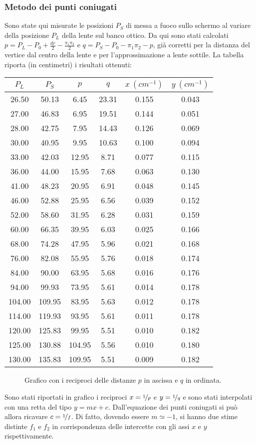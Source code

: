 \documentclass[italian,a4paper]{article}
\begin{document}
\subsubsection*{Metodo dei punti coniugati}
Sono state qui misurate le posizioni $P_S$ di messa a fuoco sullo schermo al variare della posizione $P_L$ della lente sul banco ottico. Da qui sono stati calcolati $p=P_L-P_0+\frac{dr}{2}-\frac{\pi_1\pi_2}{2}$ e $q=P_S-P_0-\pi_1\pi_2-p$, già corretti per la distanza del vertice dal centro della lente e per l'approssimazione a lente sottile. La tabella riporta (in centimetri) i risultati ottenuti:
\begin{table}[tp]
\centering
\begin{tabular}{*6c}
$P_L$& $P_S$& $p$& $q$& $x\:(\unit{cm^{-1}})$& $y\:(\unit{cm^{-1}})$\\\hline
26.50 &50.13 &6.45 &23.31 &0.155 &0.043\\
27.00 &46.83 &6.95 &19.51 &0.144 &0.051\\
28.00 &42.75 &7.95 &14.43 &0.126 &0.069\\
30.00 &40.95 &9.95 &10.63 &0.100 &0.094\\
33.00 &42.03 &12.95 &8.71 &0.077 &0.115\\
36.00 &44.00 &15.95 &7.68 &0.063 &0.130\\
41.00 &48.23 &20.95 &6.91 &0.048 &0.145\\
46.00 &52.88 &25.95 &6.56 &0.039 &0.152\\
52.00 &58.60 &31.95 &6.28 &0.031 &0.159\\
60.00 &66.35 &39.95 &6.03 &0.025 &0.166\\
68.00 &74.28 &47.95 &5.96 &0.021 &0.168\\
76.00 &82.08 &55.95 &5.76 &0.018 &0.174\\
84.00 &90.00 &63.95 &5.68 &0.016 &0.176\\
94.00 &99.93 &73.95 &5.61 &0.014 &0.178\\
104.00 &109.95 &83.95 &5.63 &0.012 &0.178\\
114.00 &119.93 &93.95 &5.61 &0.011 &0.178\\
120.00 &125.83 &99.95 &5.51 &0.010 &0.182\\
125.00 &130.88 &104.95 &5.56 &0.010 &0.180\\
130.00 &135.83 &109.95 &5.51 &0.009 &0.182
\end{tabular}
\end{table}
\begin{figure}[bp]
\centering
\caption{Grafico con i reciproci delle distanze $p$ in ascissa e $q$ in ordinata.} 
\end{figure}
\newpage\noindent
Sono stati riportati in grafico i reciproci $x=\nicefrac{1}{p}$ e $y=\nicefrac{1}{q}$ e sono stati interpolati con una retta del tipo $y=mx+c$.
 Dall'equazione dei punti coniugati si può allora ricavare $c=\nicefrac{1}{f}$. Di fatto, dovendo essere $m\simeq -1$, si hanno due stime distinte $f_1$ e $f_2$ in corrispondenza delle intercette con gli assi $x$ e $y$ rispettivamente.
\end{document}
